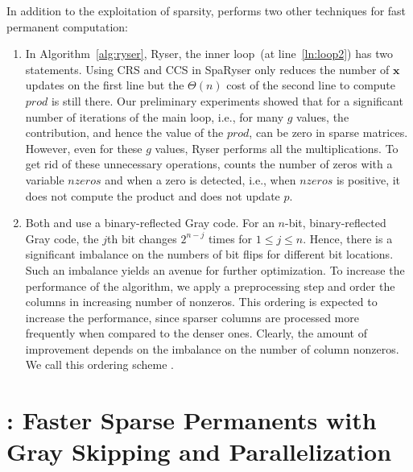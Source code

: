 \documentclass{elektr}
\newcommand{\xb}{\mathbf{x}}
\begin{document}
In addition to the exploitation of sparsity, {} performs two other techniques for fast permanent computation: 
\begin{enumerate}
\item In Algorithm~\ref{alg:ryser}, {\sc Ryser}, the inner loop~(at line~\ref{ln:loop2}) has two statements. Using CRS and CCS in {\sc SpaRyser} only reduces the number of $\xb$ updates on the first line but the $\Theta(n)$ cost of the second line to compute $prod$ is still there. Our preliminary experiments showed that for a significant number of iterations of the main loop, i.e., for many $g$ values, the contribution, and hence the value of the $prod$, can be zero in sparse matrices. However, even for these $g$ values, {\sc Ryser} performs all the multiplications. To get rid of these unnecessary operations, {} counts the number of zeros with a variable $nzeros$ and when a zero is detected, i.e., when $nzeros$ is positive, it does not compute the product and does not update $p$.   
\item Both {} and {} use a binary-reflected Gray code. For an $n$-bit, binary-reflected Gray code, the $j$th bit changes $2^{n - j}$ times for $1 \leq j \leq n$. Hence, there is a significant imbalance on the numbers of bit flips for different bit locations. Such an imbalance yields an avenue for further optimization. To increase the performance of the algorithm, we apply a preprocessing step and order the columns in increasing number of nonzeros. This ordering is expected to increase the performance, since sparser columns are processed more frequently when compared to the denser ones. Clearly, the amount of improvement depends on the imbalance on the number of column nonzeros. We call this ordering scheme {}.
\end{enumerate}

\section{{}: Faster Sparse Permanents with Gray Skipping and Parallelization} \label{sec:skip}
\end{document}
